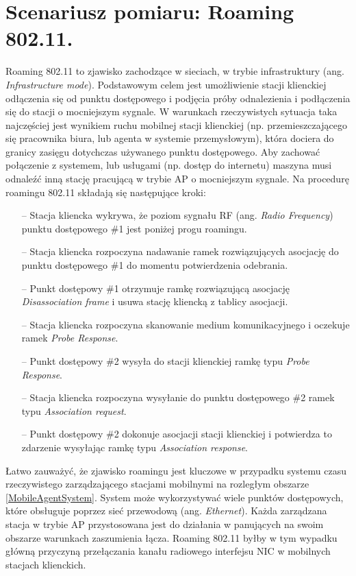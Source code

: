 \section{Scenariusz pomiaru: Roaming 802.11.}
Roaming 802.11 to zjawisko zachodzące w sieciach, w trybie infrastruktury (ang. \emph{Infrastructure mode}). Podstawowym celem jest umożliwienie stacji klienckiej odłączenia się od punktu dostępowego i podjęcia próby odnalezienia i podłączenia się do stacji o mocniejszym sygnale. W warunkach rzeczywistych sytuacja taka najczęściej jest wynikiem ruchu mobilnej stacji klienckiej (np. przemieszczającego się pracownika biura, lub agenta w systemie przemysłowym), która dociera do granicy zasięgu dotychczas używanego punktu dostępowego. Aby zachować połączenie z systemem, lub usługami (np. dostęp do internetu) maszyna musi odnaleźć inną stację pracującą w trybie AP o mocniejszym sygnale. Na procedurę roamingu 802.11 składają się następujące kroki:
\begin{itemize}
\item[--] Stacja kliencka wykrywa, że poziom sygnału RF (ang. \emph{Radio Frequency})
punktu dostępowego \#1 jest poniżej progu roamingu.
\item[--] Stacja kliencka rozpoczyna nadawanie ramek rozwiązujących asocjację do punktu dostępowego \#1 do momentu potwierdzenia odebrania.
\item[--] Punkt dostępowy \#1 otrzymuje ramkę rozwiązującą asocjację \emph{Disassociation frame} i usuwa stację kliencką z tablicy asocjacji.
\item[--] Stacja kliencka rozpoczyna skanowanie medium komunikacyjnego i oczekuje ramek \emph{Probe Response}.
\item[--] Punkt dostępowy \#2 wysyła do stacji klienckiej ramkę typu \emph{Probe Response}.
\item[--] Stacja kliencka rozpoczyna wysyłanie do punktu dostępowego \#2 ramek typu \emph{Association request}.
\item[--] Punkt dostępowy \#2 dokonuje asocjacji stacji klienckiej i potwierdza to zdarzenie wysyłając ramkę typu \emph{Association response}.
\end{itemize}

Łatwo zauważyć, że zjawisko roamingu jest kluczowe w przypadku systemu czasu rzeczywistego zarządzającego stacjami mobilnymi na rozległym obszarze \ref{MobileAgentSystem}. System może wykorzystywać wiele punktów dostępowych, które obsługuje poprzez sieć przewodową (ang. \emph{Ethernet}). Każda zarządzana stacja w trybie AP przystosowana jest do działania w panujących na swoim obszarze warunkach zaszumienia łącza. Roaming 802.11 byłby w tym wypadku główną przyczyną przełączania kanału radiowego interfejsu NIC w mobilnych stacjach klienckich. 

